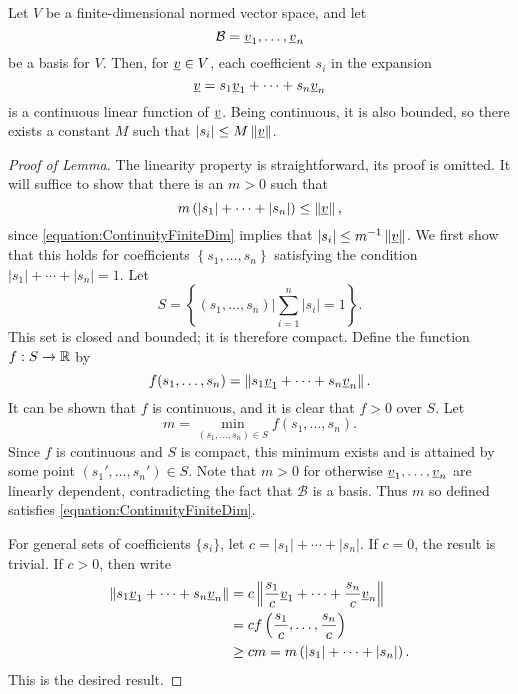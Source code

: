 \begin{lemma}
Let $V$ be a finite-dimensional normed vector space, and let
\begin{equation*}
\mathcal{B} = \underline{v}_1, \ldots, \underline{v}_n
\end{equation*}
be a basis for $V$.
Then, for $\underline{v} \in V$, each coefficient $s_i$ in the expansion
\begin{equation*}
\underline{v} = s_1 \underline{v}_1 + \cdots + s_n \underline{v}_n
\end{equation*}
is a continuous linear function of $\underline{v}$.
Being continuous, it is also bounded, so there exists a constant $M$ such that $|s_i| \leq M \left\| \underline{v} \right\|$.
\end{lemma}
\begin{proof}[Proof of Lemma]
The linearity property is straightforward, its proof is omitted.
It will suffice to show that there is an $m > 0$ such that
\begin{equation} \label{equation:ContinuityFiniteDim}
m \left( |s_1| + \cdots + |s_n| \right) \leq \left\| \underline{v} \right\| ,
\end{equation}
since \eqref{equation:ContinuityFiniteDim} implies that $|s_i| \leq m^{-1} \left\| \underline{v} \right\|$.
We first show that this holds for coefficients $\left\{ s_1, \ldots, s_n \right\}$ satisfying the condition $|s_1| + \cdots + |s_n| = 1$.
Let
\begin{equation*}
S = \left\{ (s_1, \ldots, s_n) \Big| \sum_{i=1}^n |s_i| = 1 \right\}.
\end{equation*}
This set is closed and bounded; it is therefore compact.
Define the function $f : S \rightarrow \mathbb{R}$ by
\begin{equation*}
f(s_1, \ldots, s_n) = \left\| s_1 \underline{v}_1 + \cdots + s_n \underline{v}_n \right\| .
\end{equation*}
It can be shown that $f$ is continuous, and it is clear that $f > 0$ over $S$.
Let
\begin{equation*}
m = \min_{(s_1, \ldots, s_n) \in S} f(s_1, \ldots, s_n) .
\end{equation*}
Since $f$ is continuous and $S$ is compact, this minimum exists and is attained by some point $(s_1', \ldots, s_n') \in S$.
Note that $m > 0$ for otherwise $\underline{v}_1, \ldots, \underline{v}_n$ are linearly dependent, contradicting the fact that $\mathcal{B}$ is a basis.
Thus $m$ so defined satisfies \eqref{equation:ContinuityFiniteDim}.

For general sets of coefficients $\{ s_i \}$, let $c = |s_1| + \cdots + |s_n|$.
If $c = 0$, the result is trivial.
If $c > 0$, then write
\begin{equation*}
\begin{split}
\left\| s_1 \underline{v}_1 + \cdots + s_n \underline{v}_n \right\|
&= c \left\| \frac{s_1}{c} \underline{v}_1 + \cdots + \frac{s_n}{c} \underline{v}_n \right\| \\
&= c f \left( \frac{s_1}{c}, \ldots, \frac{s_n}{c} \right) \\
&\geq c m = m \left( |s_1| + \cdots + |s_n| \right) .
\end{split}
\end{equation*}
This is the desired result.
\end{proof}

